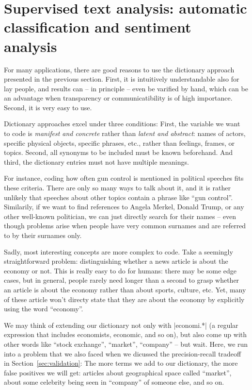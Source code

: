\section{Supervised text analysis: automatic classification and sentiment analysis}
\label{sec:supervised}

For many applications, there are good reasons to use the dictionary
approach presented in the previous section. First, it is intuitively
understandable also for lay people, and results can -- in principle --
even be varified by hand, which can be an advantage when transparency
or communicatibility is of high importance. Second, it is very easy to
use.

Dictionary approaches excel under three conditions: First, the
variable we want to code is \emph{manifest and concrete} rather than
\emph{latent and abstract}: names of actors, specific physical
objects, specific phrases, etc., rather than feelings, frames, or
topics. Second, all synonyms to be included must be known
beforehand. And third, the dictionary entries must not have multiple
meanings.

For instance, coding how often gun control is mentioned in political
speeches fits these criteria. There are only so many ways to talk
about it, and it is rather unlikely that speeches about other topics
contain a phrase like ``gun control''. Similarily, if we want to find
references to Angela Merkel, Donald Trump, or any other well-known
politician, we can just directly search for their names -- even though
problems arise when people have very common surnames and are referred
to by their surnames only.

Sadly, most interesting concepts are more complex to code. Take a
seemingly straightforward problem: distinguishing whether a news
article is about the economy or not. This is really easy to do for
humans: there may be some edge cases, but in general, people rarely
need longer than a second to grasp whether an article is about the
economy rather than about sports, culture, etc. Yet, many of these
article won't directy state that they are about the economy by
explicitly using the word ``economy''.

We may think of extending our dictionary not only with |economi.*| (a
regular expression that includes economists, economic, and so on), but
also come up with other words like ``stock exchange'', ``market'',
``company'' -- but wait. Here, we run into a problem that we also
faced when we dicussed the precision-recall tradeoff in
Section~\ref{sec:validation}: The more terms we add to our
dictionary, the more false positives we will get: articles about
geographical space called ``market'', about some celebrity being seen
in ``company'' of someone else, and so on.

